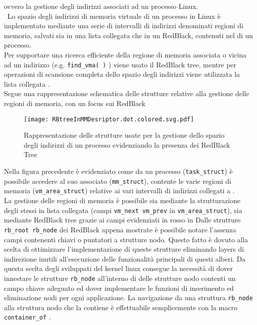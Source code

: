 ovvero la gestione degli indirizzi associati ad un processo Linux.\\\
Lo spazio degli indirizzi di memoria virtuale di un processo in Linux è implementato mediante una serie
di intervalli di indirizzi denominati regioni di memoria, salvati sia in una lista collegata che in un RedBlack, contenuti
nel \vvv{Memory Descriptor} di un processo.\\
Per supportare una ricerca efficiente della regione di memoria associata o vicina ad un indirizzo
(e.g. \verb|find_vma( )| ) viene usato il RedBlack tree, 
mentre per operazioni di scansione completa dello spazio degli indirizzi viene utilizzata la lista collegata
\cite{ulk}.\\
\voidLine
Segue una rappresentazione schematica delle strutture relative alla gestione delle regioni di memoria, con
un focus sui RedBlack 
\begin{figure}[H]
  \centering \texttt{[image: RBtreeInMMDesriptor.dot.colored.svg.pdf]}
  \caption[RedBlackTree nella gestione degli address space in Linux]
  {Rappresentazione delle strutture usate per la gestione dello spazio degli indirizzi di un processo
			evidenziando la presenza dei RedBlack Tree}
  \decoRule \label{fig:RBtreeInMMDesriptor}
\end{figure}
Nella figura precedente è evidenziato come da un processo (\verb|task_struct|) è possibile
accedere al suo \vvv{Memory Descriptor} associato (\verb|mm_struct|), contente le varie 
regioni di memoria (\verb|vm_area_struct|) relative ai vari intervalli di indirizzi 
collegati a \vvv{p}.\\
La gestione delle regioni di memoria è possibile sia mediante la strutturazione degli stessi 
in lista collegata (campi \verb|vm_next vm_prev| in \verb|vm_area_struct|),
sia mediante RedBlack tree grazie ai campi evidenziati in rosso in 
\voidLine
Dalle strutture \verb|rb_root rb_node| dei RedBlack appena mostrate è possibile notare l'assenza 
campi contenenti chiavi o puntatori a strutture nodo. 
Questo fatto è dovuto alla scelta di ottimizzare l'implementazione di queste strutture eliminando 
layers di indirezione inutili all'esecuzione delle funzionalità principali di questi alberi.
Da questa scelta degli sviluppati del kernel linux consegue la necessità di dover 
innestare le strutture \verb|rb_node| all'interno di delle strutture nodo contenti un campo chiave adeguato
ed dover implementare le funzioni di inserimento ed eliminazione nodi per ogni applicazione.
La navigazione da una struttura \verb|rb_node| alla struttura nodo che la contiene è effettuabile
semplicemente con la macro \verb|container_of| .\\%

